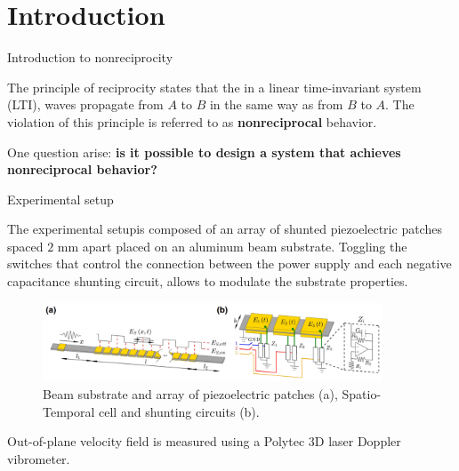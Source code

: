 \section{Introduction}


\begin{frame}{Introduction to nonreciprocity}

    The principle of reciprocity states that the in a linear time-invariant system (LTI), waves propagate from $A$ to $B$ in the same way as from $B$ to $A$.
    The violation of this principle is referred to as \textbf{nonreciprocal} behavior.

    \vspace{9pt}

    One question arise: \textbf{is it possible to design a system that achieves nonreciprocal behavior?}


\end{frame}



\begin{frame}{Experimental setup}

    The experimental setup\footnotemark[1] is composed of an array of shunted piezoelectric patches spaced $2$ mm apart placed on an aluminum beam substrate.
    Toggling the switches that control the connection between the power supply and each negative capacitance shunting circuit, allows to modulate the substrate properties.

    \begin{figure}[H]
        \centering
        \includegraphics[width=0.9\textwidth]{img/experimental_setup_scheme.png}
        \caption{Beam substrate and array of piezoelectric patches (a), Spatio-Temporal cell and shunting circuits (b).}
    \end{figure}

    Out-of-plane velocity field is measured using a Polytec 3D laser Doppler vibrometer.


\end{frame}



